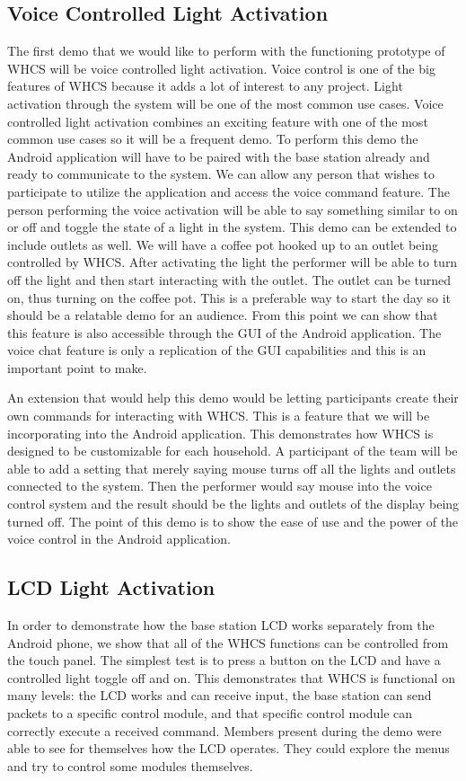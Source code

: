\subsection{Voice Controlled Light Activation}
The first demo that we would like to perform with the functioning prototype of
WHCS will be voice controlled light activation. Voice control is one of the big
features of WHCS because it adds a lot of interest to any project. Light
activation through the system will be one of the most common use cases. Voice
controlled light activation combines an exciting feature with one of the most
common use cases so it will be a frequent demo. To perform this demo the
Android application will have to be paired with the base station already and
ready to communicate to the system. We can allow any person that wishes to
participate to utilize the application and access the voice command feature.
The person performing the voice activation will be able to say something
similar to on or off and toggle the state of a light in the system. This demo
can be extended to include outlets as well. We will have a coffee pot hooked up
to an outlet being controlled by WHCS. After activating the light the performer
will be able to turn off the light and then start interacting with the outlet.
The outlet can be turned on, thus turning on the coffee pot. This is a
preferable way to start the day so it should be a relatable demo for an
audience. From this point we can show that this feature is also accessible
through the GUI of the Android application. The voice chat feature is only a
replication of the GUI capabilities and this is an important point to make.

An extension that would help this demo would be letting participants create
their own commands for interacting with WHCS. This is a feature that we will be
incorporating into the Android application. This demonstrates how WHCS is
designed to be customizable for each household. A participant of the team will
be able to add a setting that merely saying mouse turns off all the lights and
outlets connected to the system. Then the performer would say mouse into the
voice control system and the result should be the lights and outlets of the
display being turned off. The point of this demo is to show the ease of use and
the power of the voice control in the Android application.

\subsection{LCD Light Activation}
In order to demonstrate how the base station LCD works separately from the
Android phone, we show that all of the WHCS functions can be controlled
from the touch panel. The simplest test is to press a button on the LCD
and have a controlled light toggle off and on. This demonstrates that WHCS
is functional on many levels: the LCD works and can receive input, the base
station can send packets to a specific control module, and that specific
control module can correctly execute a received command.  Members present
during the demo were able to see for themselves how the LCD operates. They
could explore the menus and try to control some modules themselves.

